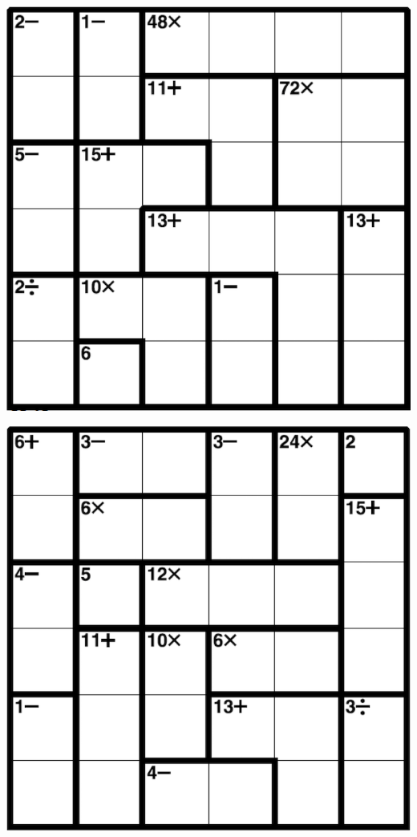 
\includegraphics[scale=1]{Gambar/Lampiran/6x6_23.png}

\includegraphics[scale=1]{Gambar/Lampiran/6x6_24.png}
